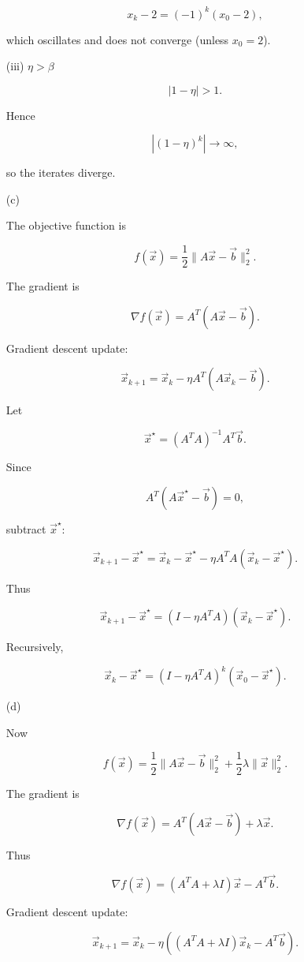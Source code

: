 \documentclass[
  12pt,
]{fphw}
\begin{document}
\begin{enumerate}
\[
x_k-2 = (-1)^k (x_0-2),
\]

which oscillates and does not converge (unless $x_0=2$).

(iii) $\eta > \beta$

\[
|1-\eta| > 1.
\]

Hence

\[
|(1-\eta)^k| \to \infty,
\]

so the iterates diverge.

\item[(c)]

The objective function is

\[
f(\vec{x}) = \frac{1}{2}\|A\vec{x}-\vec{b}\|_2^2.
\]

The gradient is

\[
\nabla f(\vec{x}) = A^T(A\vec{x}-\vec{b}).
\]

Gradient descent update:

\[
\vec{x}_{k+1}
=
\vec{x}_k - \eta A^T(A\vec{x}_k-\vec{b}).
\]

Let

\[
\vec{x}^\star = (A^TA)^{-1}A^T\vec{b}.
\]

Since

\[
A^T(A\vec{x}^\star-\vec{b}) = 0,
\]

subtract $\vec{x}^\star$:

\[
\vec{x}_{k+1}-\vec{x}^\star
=
\vec{x}_k-\vec{x}^\star
-
\eta A^TA(\vec{x}_k-\vec{x}^\star).
\]

Thus

\[
\vec{x}_{k+1}-\vec{x}^\star
=
(I-\eta A^TA)(\vec{x}_k-\vec{x}^\star).
\]

Recursively,

\[
\vec{x}_k-\vec{x}^\star
=
(I-\eta A^TA)^k(\vec{x}_0-\vec{x}^\star).
\]

\item[(d)]

Now

\[
f(\vec{x}) =
\frac{1}{2}\|A\vec{x}-\vec{b}\|_2^2
+
\frac{1}{2}\lambda\|\vec{x}\|_2^2.
\]

The gradient is

\[
\nabla f(\vec{x}) =
A^T(A\vec{x}-\vec{b}) + \lambda \vec{x}.
\]

Thus

\[
\nabla f(\vec{x})
=
(A^TA+\lambda I)\vec{x} - A^T\vec{b}.
\]

Gradient descent update:

\[
\vec{x}_{k+1}
=
\vec{x}_k
-
\eta\left((A^TA+\lambda I)\vec{x}_k - A^T\vec{b}\right).
\]


\end{enumerate}
\end{document}
